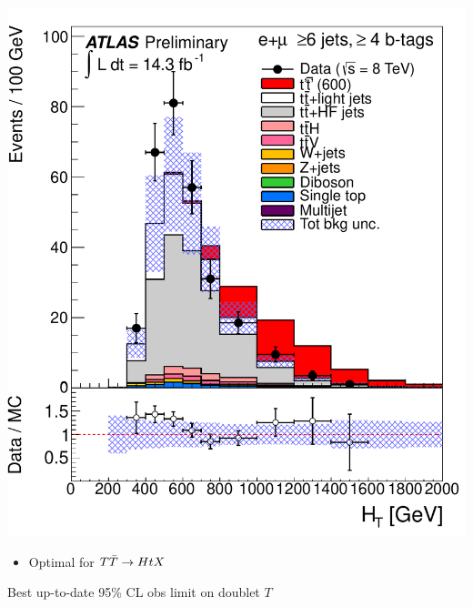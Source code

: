 \begin{frame}
\begin{minipage}{.2\textwidth}
\includegraphics[width=1.\textwidth]{pics/htx_final/HTAll_6jetin4btagin_ELEMUON.pdf}

\end{minipage}\begin{minipage}{.3\textwidth}\centering

\scriptsize
\begin{itemize}
\item Optimal for $\TTbar\to HtX$
\end{itemize}

Best up-to-date 95\% CL obs limit on doublet $T$

\end{minipage}

\end{frame}


